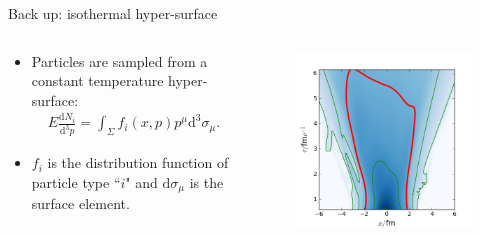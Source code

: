 \documentclass[11pt]{beamer}
\begin{document}
\begin{frame}[noframenumbering]{Back up: isothermal hyper-surface}
\begin{columns}[onlytextwidth]
  \begin{column}{0.6\textwidth}
  \begin{itemize}
	\item Particles are sampled from a constant temperature hyper-surface:
	\begin{eqnarray}
	E\frac{\mathrm{d}N_i}{\mathrm{d}^3p} = \int_\Sigma f_i(x, p)p^\mu\mathrm{d}^3\sigma_\mu.
	\end{eqnarray}
	\item $f_i$ is the distribution function of particle type ``$i$" and $\mathrm{d}\sigma_\mu$ is the surface element.
  \end{itemize}
  \end{column}
  \begin{column}{0.4\textwidth}
    \begin{figure}
   	\begin{center}
   	\includegraphics[width=\textwidth]{pics/freeze.png}
	\end{center} 	
  	\end{figure}
  \end{column}
\end{columns}
\end{frame}
\end{document}
